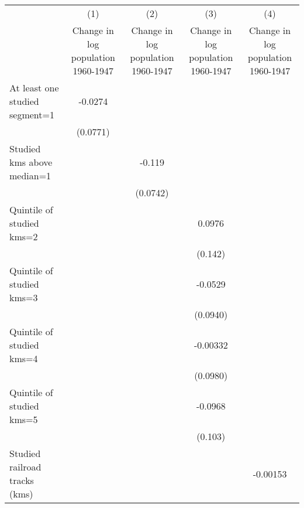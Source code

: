 {
\def\sym#1{\ifmmode^{#1}\else\(^{#1}\)\fi}
\begin{tabular}{l*{4}{c}}
\hline\hline
                    &\multicolumn{1}{c}{(1)}&\multicolumn{1}{c}{(2)}&\multicolumn{1}{c}{(3)}&\multicolumn{1}{c}{(4)}\\
                    &\multicolumn{1}{c}{Change in log population 1960-1947}&\multicolumn{1}{c}{Change in log population 1960-1947}&\multicolumn{1}{c}{Change in log population 1960-1947}&\multicolumn{1}{c}{Change in log population 1960-1947}\\
\hline
At least one studied segment=1&     -0.0274         &                     &                     &                     \\
                    &    (0.0771)         &                     &                     &                     \\
[1em]
Studied kms above median=1&                     &      -0.119         &                     &                     \\
                    &                     &    (0.0742)         &                     &                     \\
[1em]
Quintile of studied kms=2&                     &                     &      0.0976         &                     \\
                    &                     &                     &     (0.142)         &                     \\
[1em]
Quintile of studied kms=3&                     &                     &     -0.0529         &                     \\
                    &                     &                     &    (0.0940)         &                     \\
[1em]
Quintile of studied kms=4&                     &                     &    -0.00332         &                     \\
                    &                     &                     &    (0.0980)         &                     \\
[1em]
Quintile of studied kms=5&                     &                     &     -0.0968         &                     \\
                    &                     &                     &     (0.103)         &                     \\
[1em]
Studied railroad tracks (kms)&                     &                     &                     &    -0.00153         \\

\end{tabular}}
